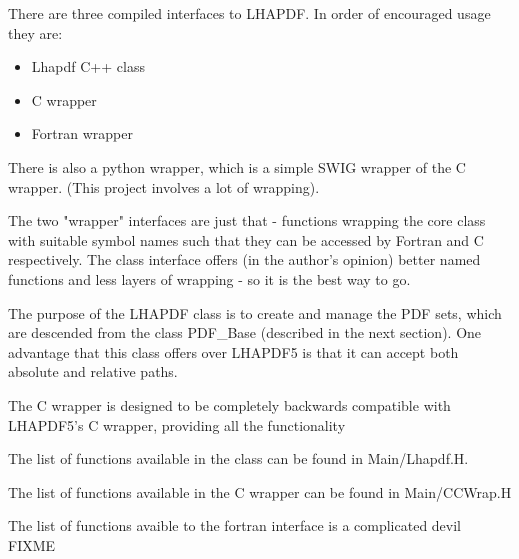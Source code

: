 There are three compiled interfaces to LHAPDF. In order of encouraged usage
they are:
\begin{itemize}
  \item Lhapdf C++ class
  \item C wrapper
  \item Fortran wrapper
\end{itemize}

There is also a python wrapper, which is a simple SWIG wrapper of the C
wrapper. (This project involves a lot of wrapping).

The two "wrapper" interfaces are just that - functions wrapping the core
class with suitable symbol names such that they can be accessed by Fortran
and C respectively. The class interface offers (in the author's opinion)
better named functions and less layers of wrapping - so it is the best way
to go.

The purpose of the LHAPDF class is to create and manage the PDF sets, which
are descended from the class PDF\_Base (described in the next section). One
advantage that this class offers over LHAPDF5 is that it can accept both
absolute and relative paths.

The C wrapper is designed to be completely backwards compatible with
LHAPDF5's C wrapper, providing all the functionality

The list of functions available in the class can be found in Main/Lhapdf.H.

The list of functions available in the C wrapper can be found in 
Main/CCWrap.H

The list of functions avaible to the fortran interface is a complicated
devil FIXME

